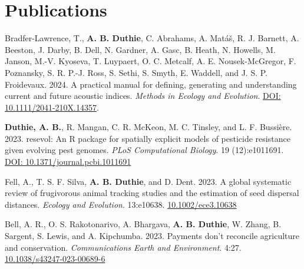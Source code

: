 \documentclass[letterpaper]{article}
\begin{document}
\section*{Publications}
\begin{etaremune}
\item Bradfer-Lawrence, T., {\bf A. B. Duthie}, C. Abrahams, A. Mat\'{a}\v{s}, R. J. Barnett, A. Beeston, J. Darby, B. Dell, N. Gardner, A. Gasc, B. Heath, N. Howells, M. Janson, M.-V. Kyoseva, T. Luypaert, O. C. Metcalf, A. E. Nousek-McGregor, F. Poznansky, S. R. P.-J. Ross, S. Sethi, S. Smyth, E. Waddell, and J. S. P. Froidevaux. 2024. A practical manual for defining, generating and understanding current and future acoustic indices. {\it Methods in Ecology and Evolution}. \href{https://besjournals.onlinelibrary.wiley.com/doi/10.1111/2041-210X.14357}{DOI: 10.1111/2041-210X.14357}.
\item {\bf Duthie, A. B.}, R. Mangan, C. R. McKeon, M. C. Tinsley, and L. F. Bussi\`{e}re. 2023. resevol: An R package for spatially explicit models of pesticide resistance given evolving pest genomes. {\it PLoS Computational Biology}. 19 (12):e1011691. \href{https://journals.plos.org/ploscompbiol/article?id=10.1371/journal.pcbi.1011691}{DOI: 10.1371/journal.pcbi.1011691}
\item Fell, A., T. S. F. Silva, {\bf A. B. Duthie}, and D. Dent. 2023. A global systematic review of frugivorous animal tracking studies and the estimation of seed dispersal distances. {\it Ecology and Evolution}. 13:e10638. \href{https://onlinelibrary.wiley.com/doi/10.1002/ece3.10638}{10.1002/ece3.10638}
\item Bell, A. R., O. S. Rakotonarivo, A. Bhargava, {\bf A. B. Duthie}, W. Zhang, B. Sargent, S. Lewis, and A. Kipchumba. 2023. Payments don't reconcile agriculture and conservation. {\it Communications Earth and Environment}. 4:27. \href{https://www.nature.com/articles/s43247-023-00689-6}{10.1038/s43247-023-00689-6}

\end{etaremune}
\end{document}
